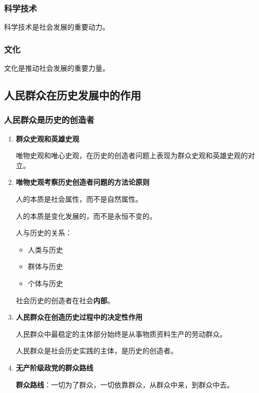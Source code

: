\documentclass[12pt, a4paper, oneside]{ctexart}
\begin{document}
\subsubsection{科学技术}

科学技术是社会发展的重要动力。

\subsubsection{文化}

文化是推动社会发展的重要力量。

\subsection{人民群众在历史发展中的作用}

\subsubsection{人民群众是历史的创造者}

\begin{enumerate}
  \item {\bf 群众史观和英雄史观}
  
  唯物史观和唯心史观，在历史的创造者问题上表现为群众史观和英雄史观的对立。

  \item {\bf 唯物史观考察历史创造者问题的方法论原则}
  
  人的本质是社会属性，而不是自然属性。

  人的本质是变化发展的，而不是永恒不变的。

  人与历史的关系：
  \begin{itemize}
    \item 人类与历史
    \item 群体与历史
    \item 个体与历史
  \end{itemize}

  社会历史的创造者在社会\textbf{内部}。

  \item {\bf 人民群众在创造历史过程中的决定性作用}
  
  人民群众中最稳定的主体部分始终是从事物质资料生产的劳动群众。

  人民群众是社会历史实践的主体，是历史的创造者。

  \item {\bf 无产阶级政党的群众路线}
  
  \textbf{群众路线}：一切为了群众，一切依靠群众，从群众中来，到群众中去。
\end{enumerate}
\end{document}
